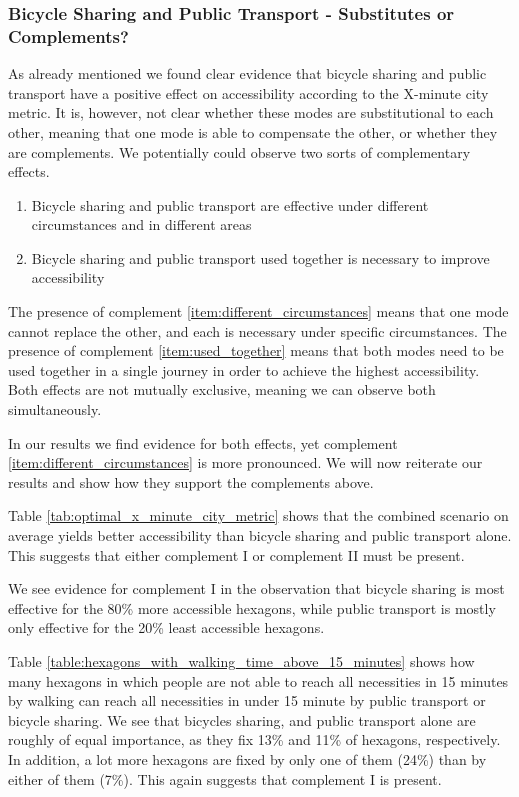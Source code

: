 \subsubsection{Bicycle Sharing and Public Transport - Substitutes or Complements?}
As already mentioned we found clear evidence that bicycle sharing and public transport have a positive effect on accessibility according to the X-minute city metric.
It is, however, not clear whether these modes are substitutional to each other, meaning that one mode is able to compensate the other, or whether they are complements.
We potentially could observe two sorts of complementary effects.
\begin{enumerate}
  \renewcommand{\labelenumi}{Complement \theenumi.}
  \item Bicycle sharing and public transport are effective under different circumstances and in different areas \label{item:different_circumstances}
  \item Bicycle sharing and public transport used together is necessary to improve accessibility \label{item:used_together}
\end{enumerate}
The presence of complement \ref{item:different_circumstances} means that one mode cannot replace the other, and each is necessary under specific circumstances.
The presence of complement \ref{item:used_together} means that both modes need to be used together in a single journey in order to achieve the highest accessibility.
Both effects are not mutually exclusive, meaning we can observe both simultaneously.

In our results we find evidence for both effects, yet complement \ref{item:different_circumstances} is more pronounced.
We will now reiterate our results and show how they support the complements above.

Table \ref{tab:optimal_x_minute_city_metric} shows that the combined scenario on average yields better accessibility than bicycle sharing and public transport alone.
This suggests that either complement I or complement II must be present.

We see evidence for complement I in the observation that bicycle sharing is most effective for the 80\% more accessible hexagons, while public transport is mostly only effective for the 20\% least accessible hexagons.

Table \ref{table:hexagons_with_walking_time_above_15_minutes} shows how many hexagons in which people are not able to reach all necessities in 15 minutes by walking can reach all necessities in under 15 minute by public transport or bicycle sharing.
We see that bicycles sharing, and public transport alone are roughly of equal importance, as they fix 13\% and 11\% of hexagons, respectively.
In addition, a lot more hexagons are fixed by only one of them (24\%) than by either of them (7\%).
This again suggests that complement I is present.


